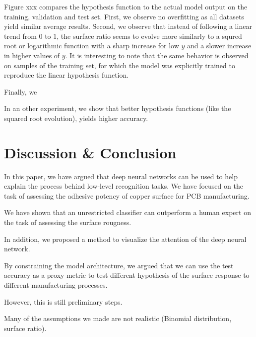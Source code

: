 \documentclass[10pt,twocolumn,letterpaper]{article}
\begin{document}
Figure xxx compares the hypothesis function to the actual model output on the training, validation and test set.
First, we observe no overfitting as all datasets yield similar average results.
Second, we observe that instead of following a linear trend from 0 to 1, 
the surface ratio seems to evolve more similarly to a squred root or logarithmic function
with a sharp increase for low $y$ and a slower increase in higher values of $y$.
It is interesting to note that the same behavior is observed on samples of the training set, 
for which the model was explicitly trained to reproduce the linear hypothesis function.

Finally, we 

In an other experiment, we show that better hypothesis functions (like the squared root evolution), 
yields higher accuracy.

\section{Discussion \& Conclusion}

In this paper, we have argued that deep neural networks can be used to help explain the process behind low-level recognition tasks.
We have focused on the task of assessing the adhesive potency of copper surface for PCB manufacturing.

We have shown that an unrestricted classifier can outperform a human expert on the task of assessing the surface rougness.


In addition, we proposed a method to visualize the attention of the deep neural network.


By constraining the model architecture, we argued that we can use the test accuracy 
as a proxy metric to test different hypothesis of the surface response to different manufacturing processes.

However, this is still preliminary steps.

Many of the assumptions we made are not realistic (Binomial distribution, surface ratio).




{\small


}
\end{document}
